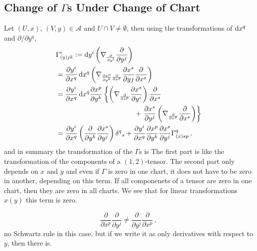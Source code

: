 \documentclass[11pt, a4paper, twocolumn]{article} %
\begin{document}
\subsection[Change of Gammas Under Change of Chart]{Change of $\Gamma$s Under Change of Chart}
Let $(U,x),\,(V,y)\in\mathcal{A}$ and $U\cap V \neq \emptyset$, then using the transformations of $\operatorname{d\!} x^q$ and
$\partial/\partial y^q$,
\begin{align*}
    &\Gamma^i_{(y)jk} := \diff y^i \left( \nabla_{\frac{\partial}{\partial y^l}} \frac{\partial}{\partial y^j} \right) \\
    &= \frac{\partial y^i}{\partial x^q}\diff x^q \left( \nabla_{\frac{\partial x^p}{\partial y^k}\frac{\partial}{\partial x^p}}
    \frac{\partial x^s}{\partial yj}\frac{\partial}{\partial x^s}\right)\\
    &= \frac{\partial y^i}{\partial x^q}\diff x^q \frac{\partial x^p}{\partial y^k} 
    \left\{ \left( \nabla_{\frac{\partial}{\partial x^p}} \frac{\partial x^s}{\partial y^i} \right) \frac{\partial}{\partial x^s} \right. \\
    &\hspace{4cm}+ \left.\frac{\partial x^s}{\partial y^j} \left( \nabla_{\frac{\partial}{\partial x^p}}\frac{\partial}{\partial x^s} \right)
    \right\}\\
    &= \frac{\partial y^i}{\partial x^q} \left(\frac{\partial}{\partial y^k} \frac{\partial x^s}{\partial y^j} \right) \delta^q{}_s
    + \frac{\partial y^i}{\partial x^q} \frac{\partial x^p}{\partial y^k} \frac{\partial x^s}{\partial y^j} \Gamma^q_{(x)sp}\,,
\end{align*}
and in summary the transformation of the $\Gamma$s is
The first part is like the transformation of the components of a $(1,2)$-tensor.
The second part only depends on $x$ and $y$ and even if $\Gamma$ is zero in one chart, it does not have to be zero
in another, depending on this term.
If all componenets of a tensor are zero in one chart, then they are zero in all charts.
We see that for linear transformations $x(y)$ this term is zero.
\begin{note}
    \begin{equation}
        \frac{\partial}{\partial x^p}\frac{\partial}{\partial y^j} \neq \frac{\partial}{\partial y^j}\frac{\partial}{\partial x^p} \,,
    \end{equation}
    no Schwartz rule in this case, but if we write it as only derivatives with respect to $y$, then there is.
\end{note}
\end{document}
